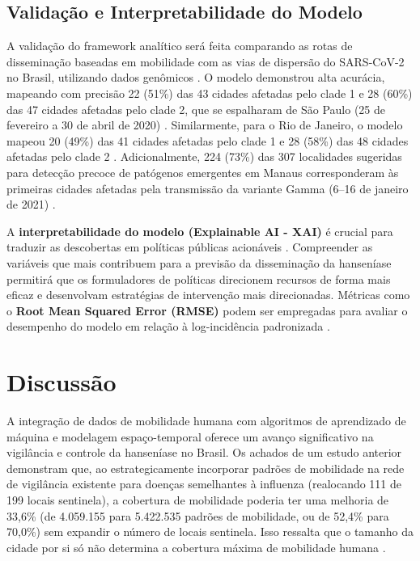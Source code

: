 \documentclass[preprint,12pt]{elsarticle}
\begin{document}
\subsection{Validação e Interpretabilidade do Modelo}
A validação do framework analítico será feita comparando as rotas de disseminação baseadas em mobilidade com as vias de dispersão do SARS-CoV-2 no Brasil, utilizando dados genômicos \cite{oliveira2024validation, oliveira2024genetic, candido2020evolution}. O modelo demonstrou alta acurácia, mapeando com precisão 22 (51\%) das 43 cidades afetadas pelo clade 1 e 28 (60\%) das 47 cidades afetadas pelo clade 2, que se espalharam de São Paulo (25 de fevereiro a 30 de abril de 2020) \cite{oliveira2024findings, oliveira2024propagation}. Similarmente, para o Rio de Janeiro, o modelo mapeou 20 (49\%) das 41 cidades afetadas pelo clade 1 e 28 (58\%) das 48 cidades afetadas pelo clade 2 \cite{oliveira2024findings, oliveira2024propagation}. Adicionalmente, 224 (73\%) das 307 localidades sugeridas para detecção precoce de patógenos emergentes em Manaus corresponderam às primeiras cidades afetadas pela transmissão da variante Gamma (6--16 de janeiro de 2021) \cite{oliveira2024findings}.

A \textbf{interpretabilidade do modelo (Explainable AI - XAI)} é crucial para traduzir as descobertas em políticas públicas acionáveis \cite{inovacao2024analise, goldstein2020convergence, tang2021fields, arik2020interpretable, rodriguez2023einns}. Compreender as variáveis que mais contribuem para a previsão da disseminação da hanseníase permitirá que os formuladores de políticas direcionem recursos de forma mais eficaz e desenvolvam estratégias de intervenção mais direcionadas. Métricas como o \textbf{Root Mean Squared Error (RMSE)} podem ser empregadas para avaliar o desempenho do modelo em relação à log-incidência padronizada \cite{madden2024sfnn}.

\section{Discussão}
A integração de dados de mobilidade humana com algoritmos de aprendizado de máquina e modelagem espaço-temporal oferece um avanço significativo na vigilância e controle da hanseníase no Brasil. Os achados de um estudo anterior \cite{oliveira2024findings} demonstram que, ao estrategicamente incorporar padrões de mobilidade na rede de vigilância existente para doenças semelhantes à influenza (realocando 111 de 199 locais sentinela), a cobertura de mobilidade poderia ter uma melhoria de 33,6\% (de 4.059.155 para 5.422.535 padrões de mobilidade, ou de 52,4\% para 70,0\%) sem expandir o número de locais sentinela. Isso ressalta que o tamanho da cidade por si só não determina a cobertura máxima de mobilidade humana \cite{oliveira2024propagation}.
\end{document}
